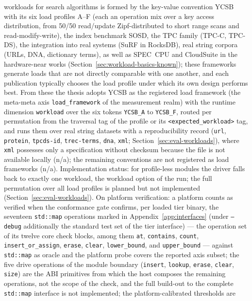 \begin{nurlang}
workloads for search algorithms is formed by the key-value convention YCSB with its six load
profiles A--F (each an operation mix over a key access distribution, from 50/50 read/update
Zipf-distributed to short range scans and read-modify-write), the index benchmark SOSD, the TPC
family (TPC-C, TPC-DS), the integration into real systems (SuRF in RocksDB), real string corpora
(URLs, DNA, dictionary terms), as well as SPEC~CPU and CloudSuite in the hardware-near works
(Section~\ref{sec:workload-basics-known}); these frameworks generate loads that are not directly
comparable with one another, and each publication typically chooses the load profile under which
its own design performs best. From these the thesis adopts YCSB as the registered load framework
(the meta-meta axis \texttt{load\_framework} of the measurement realm) with the runtime dimension
\texttt{workload} over the six tokens \texttt{YCSB\_A} to \texttt{YCSB\_F}, routed per permutation
from the traversal tag of the profile or its \texttt{<expected\_workload>} tag, and runs them over
real string datasets with a reproducibility record (\texttt{url}, \texttt{protein},
\texttt{tpcds-id}, \texttt{trec-terms}, \texttt{dna}, \texttt{xml};
Section~\ref{sec:eval-workloads}), where \texttt{xml} possesses only a specification without
checksum because the file is not available locally (n/a); the remaining conventions are not
registered as load frameworks (n/a). Implementation status: for profile-less modules the driver
falls back to exactly one workload, the workload option of the run; the full permutation over all
load profiles is planned but not implemented (Section~\ref{sec:eval-workloads}). On platform
verification: a platform counts as verified when the conformance gate confirms, per loaded tier
binary, the seventeen \texttt{std::map} operations marked in Appendix~\ref{app:interfaces} (under
\texttt{--debug} additionally the standard test set of the tier interface) --- the
operation set of its twelve core check blocks, among them \texttt{at}, \texttt{contains},
\texttt{count}, \texttt{insert\_or\_assign}, \texttt{erase}, \texttt{clear}, \texttt{lower\_bound},
and \texttt{upper\_bound} --- against \texttt{std::map} as oracle and the platform probe covers the
reported axis subset; the five drive operations of the module boundary (\texttt{insert},
\texttt{lookup}, \texttt{erase}, \texttt{clear}, \texttt{size}) are the ABI primitives from which
the host composes the remaining operations, not the scope of the check, and the full build-out to
the complete \texttt{std::map} interface is not implemented; the platform-calibrated thresholds are

\end{nurlang}
